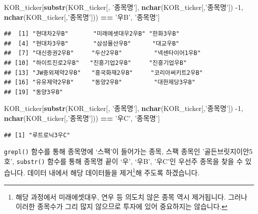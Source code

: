 \documentclass[]{book}
\newenvironment{Shaded}{\begin{snugshade}}{\end{snugshade}}
\newcommand{\DecValTok}[1]{\textcolor[rgb]{0.00,0.00,0.81}{#1}}
\newcommand{\KeywordTok}[1]{\textcolor[rgb]{0.13,0.29,0.53}{\textbf{#1}}}
\newcommand{\NormalTok}[1]{#1}
\newcommand{\OperatorTok}[1]{\textcolor[rgb]{0.81,0.36,0.00}{\textbf{#1}}}
\newcommand{\StringTok}[1]{\textcolor[rgb]{0.31,0.60,0.02}{#1}}
\let\rmarkdownfootnote\footnote%
\def\footnote{\protect\rmarkdownfootnote}
\begin{document}
\begin{Shaded}
\begin{Highlighting}[]
\NormalTok{KOR_ticker[}\KeywordTok{substr}\NormalTok{(KOR_ticker[, }\StringTok{'종목명'}\NormalTok{],}
                  \KeywordTok{nchar}\NormalTok{(KOR_ticker[,}\StringTok{'종목명'}\NormalTok{]) }\DecValTok{-1}\NormalTok{, }\KeywordTok{nchar}\NormalTok{(KOR_ticker[,}\StringTok{'종목명'}\NormalTok{])) }\OperatorTok{==}\StringTok{ '우B'}\NormalTok{, }\StringTok{'종목명'}\NormalTok{] }
\end{Highlighting}
\end{Shaded}

\begin{verbatim}
##  [1] "현대차2우B"       "미래에셋대우2우B" "한화3우B"        
##  [4] "현대차3우B"       "삼성물산우B"      "대교우B"         
##  [7] "대신증권2우B"     "두산2우B"         "넥센타이어1우B"  
## [10] "하이트진로2우B"   "진흥기업2우B"     "진흥기업우B"     
## [13] "JW중외제약2우B"   "흥국화재2우B"     "코리아써키트2우B"
## [16] "유유제약2우B"     "동양2우B"         "대한제당3우B"    
## [19] "동양3우B"
\end{verbatim}

\begin{Shaded}
\begin{Highlighting}[]
\NormalTok{KOR_ticker[}\KeywordTok{substr}\NormalTok{(KOR_ticker[, }\StringTok{'종목명'}\NormalTok{],}
                  \KeywordTok{nchar}\NormalTok{(KOR_ticker[,}\StringTok{'종목명'}\NormalTok{]) }\DecValTok{-1}\NormalTok{, }\KeywordTok{nchar}\NormalTok{(KOR_ticker[,}\StringTok{'종목명'}\NormalTok{])) }\OperatorTok{==}\StringTok{ '우C'}\NormalTok{, }\StringTok{'종목명'}\NormalTok{] }
\end{Highlighting}
\end{Shaded}

\begin{verbatim}
## [1] "루트로닉3우C"
\end{verbatim}

\texttt{grepl()} 함수를 통해 종목명에 `스팩'이 들어가는 종목, 스팩 종목인 '골든브릿지이안5호', \texttt{substr()} 함수를 통해 종목명 끝이 `우', `우B', '우C'인 우선주 종목을 찾을 수 있습니다. 데이터 내에서 해당 데이터들을 제거\footnote{해당 과정에서 미래에셋대우, 연우 등 의도치 않은 종목 역시 제거됩니다. 그러나 이러한 종목수가 그리 많지 않으므로 투자에 있어 중요하지는 않습니다.}해 주도록 하겠습니다.
\end{document}
